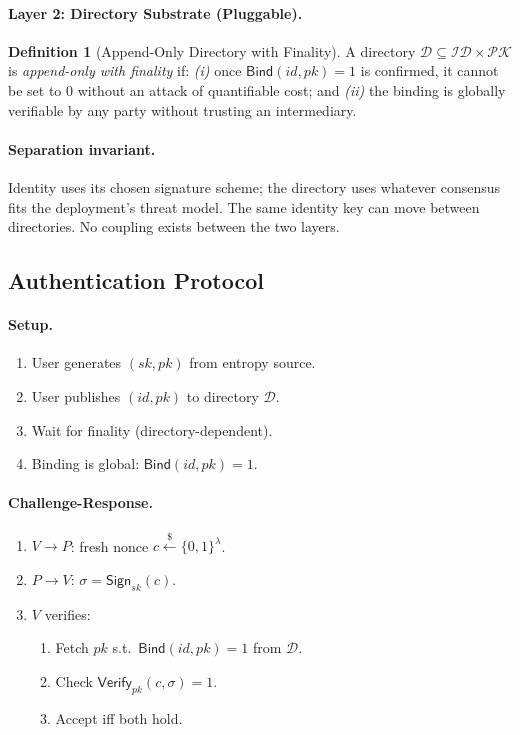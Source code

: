 \documentclass[11pt,a4paper]{article}
\theoremstyle{definition}
\newtheorem{definition}[theorem]{Definition}
\begin{document}
\paragraph{Layer 2: Directory Substrate (Pluggable).}

\begin{definition}[Append-Only Directory with Finality]
\label{def:directory}
A directory $\mathcal{D} \subseteq \mathcal{ID} \times \mathcal{PK}$
is \emph{append-only with finality} if: \emph{(i)} once
$\mathsf{Bind}(\mathit{id}, \mathit{pk}) = 1$ is confirmed, it cannot
be set to $0$ without an attack of quantifiable cost; and \emph{(ii)}
the binding is globally verifiable by any party without trusting an
intermediary.
\end{definition}

\paragraph{Separation invariant.} Identity uses its chosen signature
scheme; the directory uses whatever consensus fits the deployment's
threat model. The same identity key can move between directories.
No coupling exists between the two layers.

\subsection{Authentication Protocol}

\paragraph{Setup.}
\begin{enumerate}
  \item User generates $(\mathit{sk}, \mathit{pk})$ from entropy source.
  \item User publishes $(\mathit{id}, \mathit{pk})$ to directory
        $\mathcal{D}$.
  \item Wait for finality (directory-dependent).
  \item Binding is global: $\mathsf{Bind}(\mathit{id}, \mathit{pk})=1$.
\end{enumerate}

\paragraph{Challenge-Response.}
\begin{enumerate}
  \item $V \to P$: fresh nonce $c \xleftarrow{\$} \{0,1\}^\lambda$.
  \item $P \to V$: $\sigma = \mathsf{Sign}_{\mathit{sk}}(c)$.
  \item $V$ verifies:
    \begin{enumerate}
      \item Fetch $\mathit{pk}$ s.t.\
            $\mathsf{Bind}(\mathit{id}, \mathit{pk}) = 1$ from
            $\mathcal{D}$.
      \item Check $\mathsf{Verify}_{\mathit{pk}}(c, \sigma) = 1$.
      \item Accept iff both hold.
    \end{enumerate}
\end{enumerate}
\end{document}
